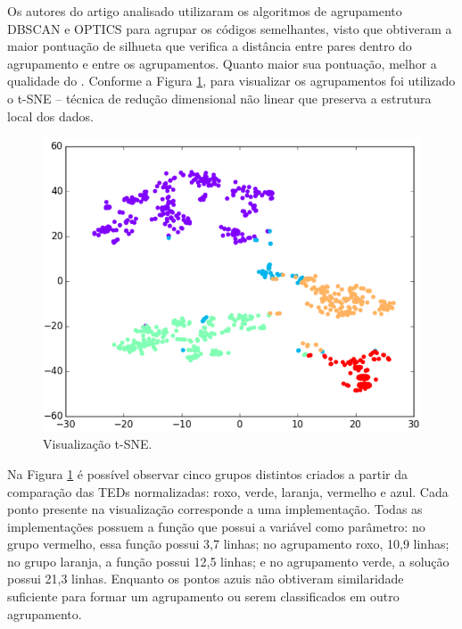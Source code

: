 	    Os autores do artigo analisado utilizaram os algoritmos de agrupamento
	    DBSCAN\cite{Ester1996} e OPTICS\cite{Ankerst1999} para agrupar os códigos
	    semelhantes, visto que obtiveram a maior pontuação de silhueta que verifica
	    a distância entre pares dentro do agrupamento e entre os agrupamentos.
	    Quanto maior sua pontuação, melhor a qualidade do . Conforme
	    a Figura \ref{fig:t-SNE}, para visualizar os agrupamentos foi utilizado o
	    t-SNE – técnica de redução dimensional não linear que preserva a estrutura
	    local dos dados.
	    \begin{figure}[ht]
	        \centering
	        \includegraphics[scale=0.5]{imagem/visualizacao-tSNE.png}
	        \captionsetup{justification=centering}
	        \caption{Visualização t-SNE.}
	        \label{fig:t-SNE}
	    \end{figure}
	    
	    Na Figura \ref{fig:t-SNE} é possível observar cinco grupos distintos
	    criados a partir da comparação das TEDs normalizadas: roxo, verde, laranja,
	    vermelho e azul. Cada ponto presente na visualização corresponde a uma
	    implementação. Todas as implementações possuem a função 
	    que possui a variável  como parâmetro: no grupo vermelho,
	    essa função possui 3,7 linhas; no agrupamento roxo, 10,9 linhas; no
	    grupo laranja, a função possui 12,5 linhas; e no agrupamento verde,
	    a solução possui 21,3 linhas. Enquanto os pontos azuis não obtiveram
	    similaridade suficiente para formar um agrupamento ou serem classificados
	    em outro agrupamento. 
	
